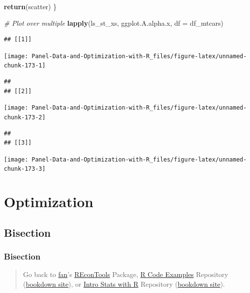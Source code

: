 \documentclass[
]{book}
\newenvironment{Shaded}{\begin{snugshade}}{\end{snugshade}}
\newcommand{\CommentTok}[1]{\textcolor[rgb]{0.56,0.35,0.01}{\textit{#1}}}
\newcommand{\DataTypeTok}[1]{\textcolor[rgb]{0.13,0.29,0.53}{#1}}
\newcommand{\KeywordTok}[1]{\textcolor[rgb]{0.13,0.29,0.53}{\textbf{#1}}}
\newcommand{\NormalTok}[1]{#1}
\begin{document}
\begin{Shaded}
\begin{Highlighting}[]
\KeywordTok{return}\NormalTok{(scatter)}
\NormalTok{\}}

\CommentTok{\# Plot over multiple}
\KeywordTok{lapply}\NormalTok{(ls\_st\_xs,}
\NormalTok{       ggplot.A.alpha.x,}
       \DataTypeTok{df =}\NormalTok{ df\_mtcars)}
\end{Highlighting}
\end{Shaded}

\begin{verbatim}
## [[1]]
\end{verbatim}

\begin{center}\texttt{[image: Panel-Data-and-Optimization-with-R\_files/figure-latex/unnamed-chunk-173-1]} \end{center}

\begin{verbatim}
## 
## [[2]]
\end{verbatim}

\begin{center}\texttt{[image: Panel-Data-and-Optimization-with-R\_files/figure-latex/unnamed-chunk-173-2]} \end{center}

\begin{verbatim}
## 
## [[3]]
\end{verbatim}

\begin{center}\texttt{[image: Panel-Data-and-Optimization-with-R\_files/figure-latex/unnamed-chunk-173-3]} \end{center}

\hypertarget{optimization}{%
\chapter{Optimization}\label{optimization}}

\hypertarget{bisection}{%
\section{Bisection}\label{bisection}}

\hypertarget{bisection-1}{%
\subsection{Bisection}\label{bisection-1}}

\begin{quote}
Go back to \href{http://fanwangecon.github.io/}{fan}'s \href{https://fanwangecon.github.io/REconTools/}{REconTools} Package, \href{https://fanwangecon.github.io/R4Econ/}{R Code Examples} Repository (\href{https://fanwangecon.github.io/R4Econ/bookdown}{bookdown site}), or \href{https://fanwangecon.github.io/Stat4Econ/}{Intro Stats with R} Repository (\href{https://fanwangecon.github.io/Stat4Econ/bookdown}{bookdown site}).
\end{quote}
\end{document}
